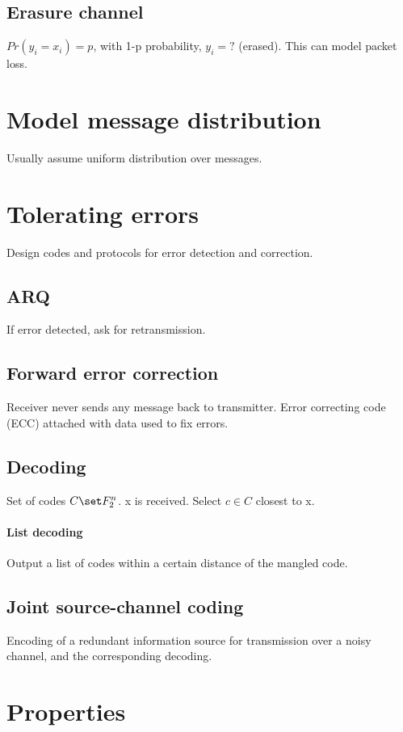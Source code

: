 \documentclass[oneside, article]{memoir}
\begin{document}
\subsection{Erasure channel}
$Pr(y_i  = x_i) = p$, with 1-p probability, $y_i = ?$ (erased). This can model packet loss.

\section{Model message distribution}
Usually assume uniform distribution over messages.

\section{Tolerating errors}
Design codes and protocols for error detection and correction.

\subsection{ARQ}
If error detected, ask for retransmission.

\subsection{Forward error correction}
Receiver never sends any message back to transmitter. Error correcting code (ECC) attached with data used to fix errors.

\subsection{Decoding}
Set of codes $C \set F_{2}^{n}$. x is received. Select $c \in C$ closest to x.

\paragraph*{List decoding}
Output a list of codes within a certain distance of the mangled code.

\subsection{Joint source-channel coding}
Encoding of a redundant information source for transmission over a noisy channel, and the corresponding decoding. \tbc

\section{Properties}
\end{document}
